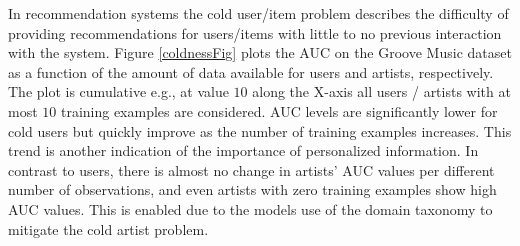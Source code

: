 


In recommendation systems the cold  user/item problem describes the difficulty of
providing recommendations for users/items with little to no previous interaction with the system. 
Figure \ref{coldnessFig} plots the AUC on the Groove Music dataset as a function of the amount of data available for users and artists, respectively. The plot is cumulative e.g., at value $10$ along the X-axis all users / artists with at most $10$ training examples are considered. AUC levels are significantly lower for cold users but quickly improve as the number of training examples increases. This trend is another indication of the importance of personalized information. In contrast to users, there is almost no change in artists' AUC values per different number of observations, and even artists with zero training examples show high AUC values.
This is enabled due to the models use of the domain taxonomy to mitigate the cold artist problem. %



